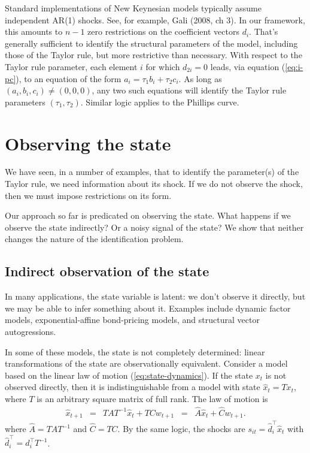 \documentclass[12pt]{article}
\begin{document}
{Standard implementations of New Keynesian models typically assume
independent AR(1) shocks.
See, for example, Gali (2008, ch 3).
In our framework, this amounts to $n-1$ zero restrictions on the coefficient vectors $d_i$.
That's generally sufficient to identify the structural parameters of the model,
including those of the Taylor rule,
but more restrictive than necessary.
With respect to the Taylor rule parameter,
each element $i$ for which $d_{2i}=0$ leads,
via equation (\ref{eq:i-pc}),
to an equation of the form $a_i = \tau_1 b_i + \tau_2 c_i$.
As long as $(a_i,b_i,c_i) \neq (0,0,0)$, any two such equations will
identify the Taylor rule parameters $(\tau_1,\tau_2)$.
Similar logic applies to the Phillips curve.


\section{Observing the state}
\label{sec:observability}

We have seen, in a number of examples, that to identify the parameter(s) of the Taylor rule,
we need information about its shock.
If we do not observe the shock, then we must impose restrictions on its form.

Our approach so far is predicated on observing the state.
What happens if we observe the state indirectly?
Or a noisy signal of the state?
We show that neither changes the nature of the identification problem.


\subsection{Indirect observation of the state}

In many applications, the state variable is latent:
we don't observe it directly,
but we may be able to infer something about it.
Examples include dynamic factor models,
exponential-affine bond-pricing models,
and structural vector autogressions.

In some of these models, the state is not completely determined:
linear transformations of the state are observationally equivalent.
Consider a model based on the linear law of motion (\ref{eq:state-dynamics}).
If the state $x_t$ is not observed directly, then it is indistinguishable
from a model with state $\hat{x}_t = T x_t$,
where $T$ is an arbitrary square matrix of full rank.
The law of motion is
\begin{eqnarray}
    \hat{x}_{t+1} &=& T A T^{-1} \hat{x}_t + T C w_{t+1}
            \;\;=\;\; \widehat{A} \hat{x}_t + \widehat{C} w_{t+1} .
    \label{eq:state-dynamics-transformed}
\end{eqnarray}
where $\widehat{A} = T A T^{-1}$ and $\widehat{C} = T C$.
By the same logic,
the shocks are $ s_{it} = \hat{d}_i^{\top} \hat{x}_t$ with
$ \hat{d}_i^{\top} = {d}_i^\top T^{-1} $.


}
\end{document}
